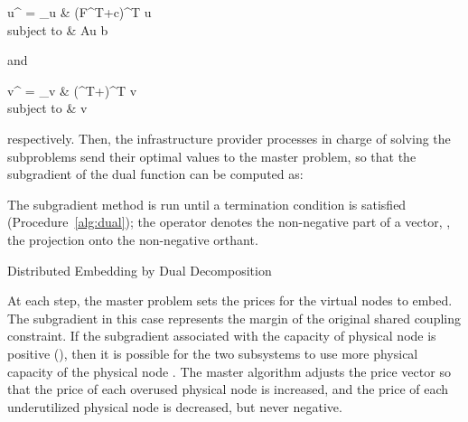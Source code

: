 \documentclass[a4paper, 10pt, conference]{ieeeconf}
\begin{document}
u^{\star} = \max_u & (F^T\lambda +c)^T u \\
{\rm  subject \; \rm to} & Au \leq b
\label{subproblem1}
   
\vspace{-2mm}
and
\vspace{-2mm}
 
v^{\star} = \max_v & (^T\lambda +)^T v \\
{\rm  subject \; \rm to} & v \leq {}
\label{subproblem2}

respectively.  Then,  the infrastructure provider processes in charge of solving the subproblems send their optimal values to the master problem, so that the subgradient of the dual function can be computed as:

The subgradient method is run until a termination condition is satisfied (Procedure~\ref{alg:dual}); the operator  denotes the non-negative part of a vector, , the projection onto the non-negative orthant.
\begin{algorithm}[t]                   
\caption{\small{Distributed Embedding by Dual Decomposition}}
\begin{algorithmic}[1]              
\end{algorithmic}
\label{alg:dual}
\end{algorithm} 

At each step, the master problem sets the prices for the virtual nodes to embed. The subgradient  
in this case represents the margin of the original shared coupling constraint. If the subgradient associated with the capacity of physical node  is positive (), then it is possible for the two subsystems to use more physical capacity of the physical node . 
The master algorithm adjusts the price vector so that the price of each overused physical node is increased, and the price of each underutilized physical node is decreased, but never negative.
\end{document}
